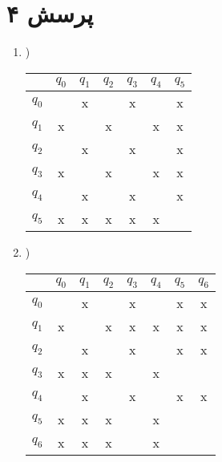 \documentclass[a4paper]{article}
\begin{document}
\pagebreak

\section*{پرسش ۴}
\begin{enumerate}[label=\Alph*]
\item{)}
 \begin{latin}
\begin{center}
 \begin{tabular}{|c || c | c | c | c | c | c|} 
 \hline
 & $ q_0$ & $q_1$ &$ q_2$ & $q_3$ &$ q_4$ & $q_5$ \\ [0.5ex] 
 \hline
$ q_0$ &  & x  &  & x & & x\\ 
 \hline
$ q_1$ & x &  & x &  & x & x\\ 
 \hline
$ q_2$ &  & x & & x & & x\\ 
 \hline
$ q_3$ & x  &  & x &  & x & x\\ 
 \hline
$ q_4$ &  & x & & x & & x\\ 
 \hline
$ q_5$ & x & x & x & x & x &\\ 
 \hline
\end{tabular}
\end{center}


\end{latin}

\item{)}
 \begin{latin}
\begin{center}
 \begin{tabular}{|c || c | c | c | c | c | c | c|} 
 \hline
 & $ q_0$ & $q_1$ &$ q_2$ & $q_3$ &$ q_4$ & $q_5$  & $q_6$ \\ [0.5ex] 
 \hline
$ q_0$ &  & x &  & x & & x & x\\ 
 \hline
$ q_1$ & x &  & x & x & x & x & x\\ 
 \hline
$ q_2$ &  & x & & x & & x &x\\ 
 \hline
$ q_3$ & x  & x  & x &  & x & &\\ 
 \hline
$ q_4$ &  & x & & x & & x &x\\ 
 \hline
$ q_5$ & x & x & x &  & x & &\\ 
 \hline
$q_6$  & x & x & x & & x & &\\ 
 \hline
\end{tabular}
\end{center}


\end{latin}
\end{enumerate}
\end{document}
